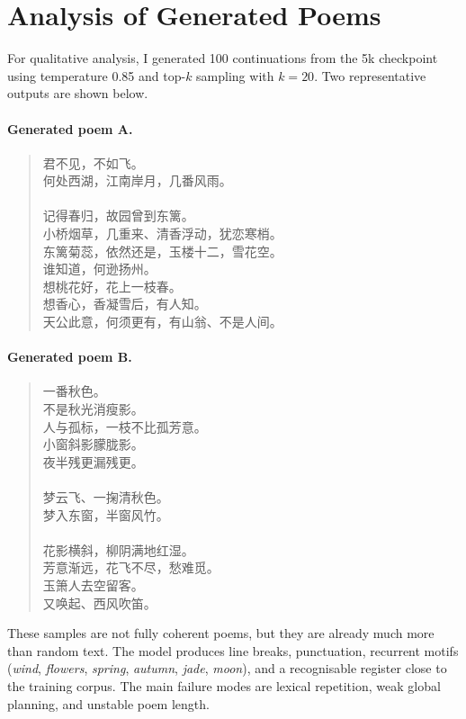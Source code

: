 \documentclass[11pt]{article}
\begin{document}
\section{Analysis of Generated Poems}
For qualitative analysis, I generated 100 continuations from the 5k checkpoint using temperature 0.85 and top-$k$ sampling with $k=20$. Two representative outputs are shown below.

\paragraph{Generated poem A.}
\begin{quote}\small
君不见，不如飞。\\
何处西湖，江南岸月，几番风雨。\\
\\
记得春归，故园曾到东篱。\\
小桥烟草，几重来、清香浮动，犹恋寒梢。\\
东篱菊蕊，依然还是，玉楼十二，雪花空。\\
谁知道，何逊扬州。\\
想桃花好，花上一枝春。\\
想香心，香凝雪后，有人知。\\
天公此意，何须更有，有山翁、不是人间。
\end{quote}

\paragraph{Generated poem B.}
\begin{quote}\small
一番秋色。\\
不是秋光消瘦影。\\
人与孤标，一枝不比孤芳意。\\
小窗斜影朦胧影。\\
夜半残更漏残更。\\
\\
梦云飞、一掬清秋色。\\
梦入东窗，半窗风竹。\\
\\
花影横斜，柳阴满地红湿。\\
芳意渐远，花飞不尽，愁难觅。\\
玉箫人去空留客。\\
又唤起、西风吹笛。
\end{quote}

These samples are not fully coherent poems, but they are already much more than random text. The model produces line breaks, punctuation, recurrent motifs (\emph{wind}, \emph{flowers}, \emph{spring}, \emph{autumn}, \emph{jade}, \emph{moon}), and a recognisable register close to the training corpus. The main failure modes are lexical repetition, weak global planning, and unstable poem length.
\end{document}
